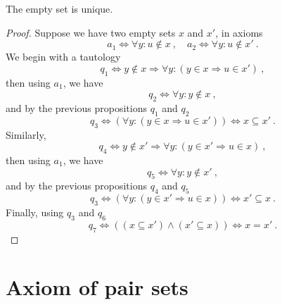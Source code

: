    \begin{theorem}
        The empty set is unique.
    \end{theorem}
    \begin{proof}
        Suppose we have two empty sets $x$ and $x'$, in axioms
        \begin{equation*}
            a_1 \Leftrightarrow \forall y \colon u \notin x ~, \quad a_2 \Leftrightarrow \forall y \colon u \notin x' ~.
        \end{equation*}
        We begin with a tautology 
        \begin{equation*}
            q_1 \Leftrightarrow y \notin x \Rightarrow \forall y \colon (y \in x \Rightarrow u \in x') ~,
        \end{equation*}
        then using $a_1$, we have
        \begin{equation*}
            q_2 \Leftrightarrow \forall y \colon y \notin x ~,
        \end{equation*}
        and by the previous propositions $q_1$ and $q_2$ 
        \begin{equation*}
            q_3 \Leftrightarrow (\forall y \colon (y\in x \Rightarrow u \in x')) \Leftrightarrow x \subseteq x' ~.
        \end{equation*}
        Similarly, 
        \begin{equation*}
            q_4 \Leftrightarrow y \notin x' \Rightarrow \forall y \colon (y \in x' \Rightarrow u \in x) ~,
        \end{equation*}
        then using $a_1$, we have
        \begin{equation*}
            q_5 \Leftrightarrow \forall y \colon y \notin x' ~,
        \end{equation*}
        and by the previous propositions $q_4$ and $q_5$ 
        \begin{equation*}
            q_3 \Leftrightarrow (\forall y \colon (y\in x' \Rightarrow u \in x)) \Leftrightarrow x' \subseteq x ~.
        \end{equation*}
        Finally, using $q_3$ and $q_6$
        \begin{equation*}
            q_7 \Leftrightarrow ((x \subseteq x') \land (x' \subseteq x)) \Leftrightarrow x = x' ~.
        \end{equation*}
    \end{proof}

\section{Axiom of pair sets}

